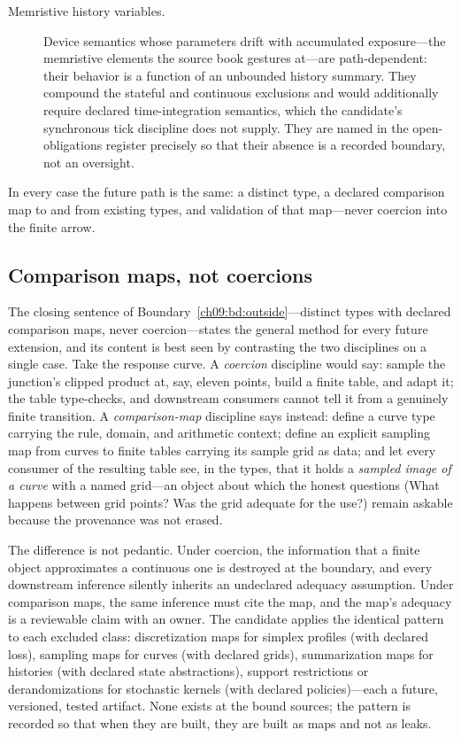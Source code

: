 \begin{boundary}
\begin{description}
\item[Memristive history variables.] Device semantics whose parameters drift with accumulated exposure---the memristive elements the source book gestures at---are path-dependent: their behavior is a function of an unbounded history summary. They compound the stateful and continuous exclusions and would additionally require declared time-integration semantics, which the candidate's synchronous tick discipline does not supply. They are named in the open-obligations register precisely so that their absence is a recorded boundary, not an oversight.
\end{description}
In every case the future path is the same: a distinct type, a declared comparison map to and from existing types, and validation of that map---never coercion into the finite arrow.
\end{boundary}

\subsection{Comparison maps, not coercions}\label{ch09:sub:comparison}

The closing sentence of Boundary~\ref{ch09:bd:outside}---distinct types with declared comparison maps, never coercion---states the general method for every future extension, and its content is best seen by contrasting the two disciplines on a single case. Take the response curve. A \emph{coercion} discipline would say: sample the junction's clipped product at, say, eleven points, build a finite table, and adapt it; the table type-checks, and downstream consumers cannot tell it from a genuinely finite transition. A \emph{comparison-map} discipline says instead: define a curve type carrying the rule, domain, and arithmetic context; define an explicit sampling map from curves to finite tables carrying its sample grid as data; and let every consumer of the resulting table see, in the types, that it holds a \emph{sampled image of a curve} with a named grid---an object about which the honest questions (What happens between grid points? Was the grid adequate for the use?) remain askable because the provenance was not erased.

The difference is not pedantic. Under coercion, the information that a finite object approximates a continuous one is destroyed at the boundary, and every downstream inference silently inherits an undeclared adequacy assumption. Under comparison maps, the same inference must cite the map, and the map's adequacy is a reviewable claim with an owner. The candidate applies the identical pattern to each excluded class: discretization maps for simplex profiles (with declared loss), sampling maps for curves (with declared grids), summarization maps for histories (with declared state abstractions), support restrictions or derandomizations for stochastic kernels (with declared policies)---each a future, versioned, tested artifact. None exists at the bound sources; the pattern is recorded so that when they are built, they are built as maps and not as leaks.


